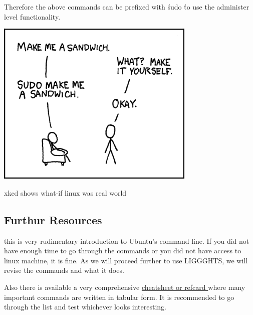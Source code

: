 \documentclass{tufte-book} %
\begin{document}
Therefore the above commands can be prefixed with \' sudo \'  to use the administer level functionality.

\begin{marginfigure}
\includegraphics[width=\linewidth]{sandwich.png}
\caption{xkcd shows what-if linux was real world}
\label{fig:sandwich}
\end{marginfigure}

\subsection{Furthur Resources}
 this is very rudimentary introduction to Ubuntu's command line. If you did not have enough time to go through the commands or you did not have access to linux machine, it is fine. As we will proceed further to use LIGGGHTS, we will revise the commands and what it does.

Also there is available a very comprehensive \href{http://cli.learncodethehardway.org/bash_cheat_sheet.pdf}{cheatsheet or refcard } where many important commands are written in tabular form. It is recommended to go through the list and test whichever looks interesting. 
\end{document}
